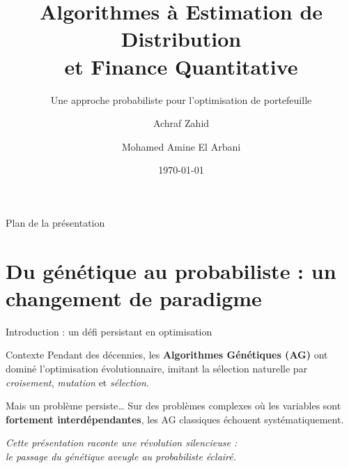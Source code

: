 \documentclass[10pt,aspectratio=169]{beamer}
\title[EDA \& Finance Quantitative]{Algorithmes à Estimation de Distribution\\et Finance Quantitative}
\subtitle{Une approche probabiliste pour l'optimisation de portefeuille}
\author[Zahid \& El Arbani]{Achraf Zahid \and Mohamed Amine El Arbani}
\institute[]{Sous la coordination de \\ \textbf{Pr. Abderrahim Azouani}}
\date{\today}
\begin{document}

\begin{frame}[plain]
\titlepage
\begin{center}
\end{center}
\end{frame}

\begin{frame}{Plan de la présentation}
\tableofcontents[hideallsubsections]
\end{frame}

\section{Du génétique au probabiliste : un changement de paradigme}

\begin{frame}{Introduction : un défi persistant en optimisation}
\begin{block}{Contexte}
Pendant des décennies, les \textbf{Algorithmes Génétiques (AG)} ont dominé l'optimisation évolutionnaire, imitant la sélection naturelle par \emph{croisement}, \emph{mutation} et \emph{sélection}.
\end{block}

\vspace{0.3cm}
\begin{alertblock}{Mais un problème persiste\ldots}
Sur des problèmes complexes où les variables sont \textbf{fortement interdépendantes}, les AG classiques échouent systématiquement.
\end{alertblock}

\vspace{0.5cm}
\centering
\large
\textit{Cette présentation raconte une révolution silencieuse :}\\
\textit{le passage du génétique aveugle au probabiliste éclairé.}
\end{frame}
\end{document}
